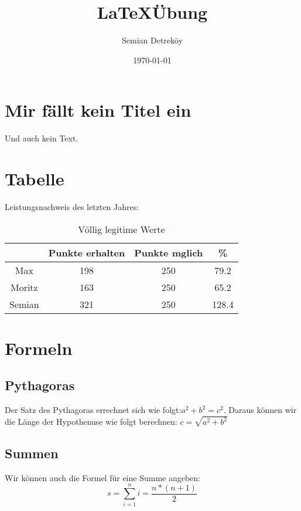 \documentclass{article}
\author{Semian Detreköy}
\date{\today}
\title{\LaTeX \space \"Ubung}
\begin{document}
\maketitle
\section{Mir f\"allt kein Titel ein}
Und auch kein Text.
\section{Tabelle}
Leistungsnachweis des letzten Jahres:
\begin{table}[h]
\centering
\begin{tabular}{c|c|c|c}
  & Punkte erhalten & Punkte mglich & \% \\
\hline Max & 198 & 250 & 79.2 \\
Moritz & 163 & 250 & 65.2 \\
Semian & 321 & 250 & 128.4 \\
\end{tabular}
\caption{V\"ollig legitime Werte}
\end{table}
\section{Formeln}
\subsection{Pythagoras}
Der Satz des Pythagoras errechnet sich wie folgt:$a^2+b^2=c^2$. Daraus können wir die Länge der Hypothenuse wie folgt berechnen: $c=\sqrt{a^2+b^2}$
\subsection{Summen}
Wir k\"onnen auch die Formel f\"ur eine Summe angeben:
\begin{equation}
s=\sum\limits_{i=1}^{n}i=\frac{n*(n+1)}{2}
\end{equation}
\end{document}
